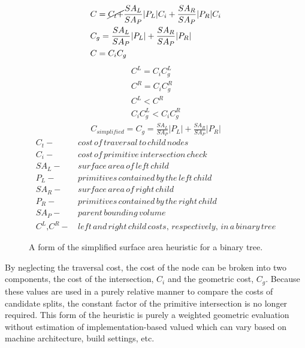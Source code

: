 \begin{figure}[H]
  \begin{align}
&C =  \cancel{C_{t} +} \frac{SA_{L}}{SA_{P}} |P_{L}|C_{i} + \frac{SA_{R}}{SA_{P}} |P_{R}|C_{i} \\
&C_{g} = \frac{SA_{L}}{SA_{P}} |P_{L}| +  \frac{SA_{R}}{SA_{P}}|P_{R}| \\
&C = C_{i}C_{g}
  \end{align}
  \begin{align*}
    C^{L} = C_{i} C^{L}_{g} \\
    C^{R} = C_{i} C^{R}_{g} \\
    C^{L} < C^{R} \\
    C_{i}C^{L}_{g} < C_{i}C^{R}_{g}
  \end{align*}
  \begin{align}
    C_{simplified} = C_{g} = \frac{SA_{L}}{SA_{P}} |P_{L}| +  \frac{SA_{R}}{SA_{P}}|P_{R}|
  \end{align}
  \label{eq:simplified_sah}
  \begin{align*}
    C_{t} - & \,cost\, of\, traversal\, to\, child\, nodes \\
    C_{i} - & \, cost\, of\, primitive\, intersection\, check\, \\
    SA_{L} - &  \,surface\, area\, of\, left\, child \\
    P_{L} - & \, primitives\, contained\, by\, the\, left\, child  \\
    SA_{R} - & \, surface\, area\, of\, right\, child \\
    P_{R} - & \, primitives\, contained\, by\, the\, right\, child \\
    SA_{P} - & \, parent\, bounding\, volume \\
    C^{L} \text{,} C^{R} - & \, left \, and \, right \, child \, costs, \, respectively, \, in \, a \, binary \, tree
  \end{align*}
  
  \caption{A form of the simplified surface area heuristic for a binary tree.}
  \label{fig:SSAH}
\end{figure}

By neglecting the traversal cost, the cost of the node can be broken into two
components, the cost of the intersection, $C_{i}$ and the geometric cost,
$C_{g}$. Because these values are used in a purely relative manner to compare
the costs of candidate splits, the constant factor of the primitive intersection
is no longer required. This form of the heuristic is purely a weighted geometric
evaluation without estimation of implementation-based valued which can vary
based on machine architecture, build settings, etc.

